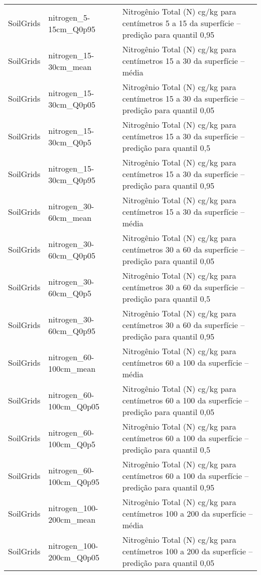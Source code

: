 \begin{longtable}{@{} p{4cm} p{4cm} p{8cm} @{}}
	SoilGrids &
	nitrogen\_5-15cm\_Q0p95 &
	Nitrogênio Total (N) cg/kg  para centímetros 5 a 15 da superfície – predição para quantil 0,95 \\
	SoilGrids &
	nitrogen\_15-30cm\_mean &
	Nitrogênio Total (N) cg/kg  para centímetros 15 a 30 da superfície – média \\
	SoilGrids &
	nitrogen\_15-30cm\_Q0p05 &
	Nitrogênio Total (N) cg/kg  para centímetros 15 a 30 da superfície – predição para quantil 0,05 \\
	SoilGrids &
	nitrogen\_15-30cm\_Q0p5 &
	Nitrogênio Total (N) cg/kg  para centímetros 15 a 30 da superfície – predição para quantil 0,5 \\
	SoilGrids &
	nitrogen\_15-30cm\_Q0p95 &
	Nitrogênio Total (N) cg/kg  para centímetros 15 a 30 da superfície – predição para quantil 0,95 \\
	SoilGrids &
	nitrogen\_30-60cm\_mean &
	Nitrogênio Total (N) cg/kg  para centímetros 15 a 30 da superfície – média \\
	SoilGrids &
	nitrogen\_30-60cm\_Q0p05 &
	Nitrogênio Total (N) cg/kg  para centímetros 30 a 60 da superfície – predição para quantil 0,05 \\
	SoilGrids &
	nitrogen\_30-60cm\_Q0p5 &
	Nitrogênio Total (N) cg/kg  para centímetros 30 a 60 da superfície – predição para quantil 0,5 \\
	SoilGrids &
	nitrogen\_30-60cm\_Q0p95 &
	Nitrogênio Total (N) cg/kg  para centímetros 30 a 60 da superfície – predição para quantil 0,95 \\
	SoilGrids &
	nitrogen\_60-100cm\_mean &
	Nitrogênio Total (N) cg/kg  para centímetros 60 a 100 da superfície – média \\
	SoilGrids &
	nitrogen\_60-100cm\_Q0p05 &
	Nitrogênio Total (N) cg/kg  para centímetros 60 a 100 da superfície – predição para quantil 0,05 \\
	SoilGrids &
	nitrogen\_60-100cm\_Q0p5 &
	Nitrogênio Total (N) cg/kg  para centímetros 60 a 100 da superfície – predição para quantil 0,5 \\
	SoilGrids &
	nitrogen\_60-100cm\_Q0p95 &
	Nitrogênio Total (N) cg/kg  para centímetros 60 a 100 da superfície – predição para quantil 0,95 \\
	SoilGrids &
	nitrogen\_100-200cm\_mean &
	Nitrogênio Total (N) cg/kg  para centímetros 100 a 200 da superfície – média \\
	SoilGrids &
	nitrogen\_100-200cm\_Q0p05 &
	Nitrogênio Total (N) cg/kg  para centímetros 100 a 200 da superfície – predição para quantil 0,05 \\

\end{longtable}

